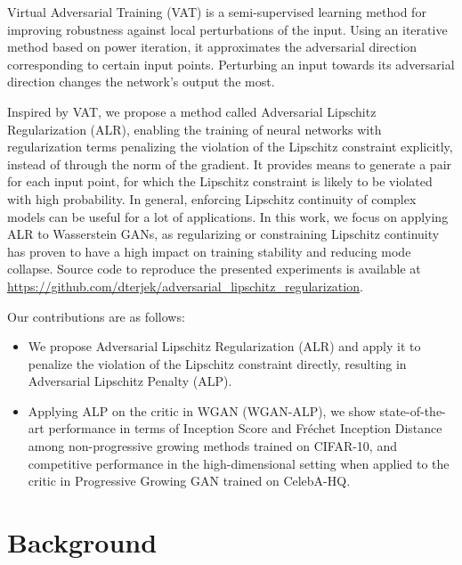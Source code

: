 \documentclass{article}
\begin{document}
Virtual Adversarial Training (VAT) \citep{Miyatoetal2017} is a semi-supervised learning method for improving robustness against local perturbations of the input. Using an iterative method based on power iteration, it approximates the adversarial direction corresponding to certain input points. Perturbing an input towards its adversarial direction changes the network's output the most.

Inspired by VAT, we propose a method called Adversarial Lipschitz Regularization (ALR), enabling the training of neural networks with regularization terms penalizing the violation of the Lipschitz constraint explicitly, instead of through the norm of the gradient. It provides means to generate a pair for each input point, for which the Lipschitz constraint is likely to be violated with high probability. In general, enforcing Lipschitz continuity of complex models can be useful for a lot of applications. In this work, we focus on applying ALR to Wasserstein GANs, as regularizing or constraining Lipschitz continuity has proven to have a high impact on training stability and reducing mode collapse. Source code to reproduce the presented experiments is available at \href{https://github.com/dterjek/adversarial_lipschitz_regularization}{https://github.com/dterjek/adversarial\_lipschitz\_regularization}.

Our contributions are as follows:

\begin{itemize}
\item We propose Adversarial Lipschitz Regularization (ALR) and apply it to penalize the violation of the Lipschitz constraint directly, resulting in Adversarial Lipschitz Penalty (ALP).
\item Applying ALP on the critic in WGAN (WGAN-ALP), we show state-of-the-art performance in terms of Inception Score and Fr\'echet Inception Distance among non-progressive growing methods trained on CIFAR-10, and competitive performance in the high-dimensional setting when applied to the critic in Progressive Growing GAN trained on CelebA-HQ.
\end{itemize}

\section{Background}
\label{background}
\end{document}
